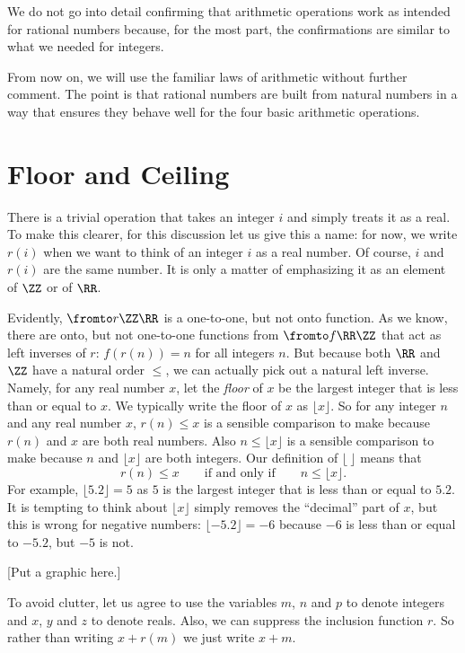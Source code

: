 \documentclass[10pt,oneside,tightlist]{memoir}
\begin{document}
We do not go into detail confirming that arithmetic operations work as intended for rational numbers because, for the most part,
the confirmations are similar to what we needed for integers.

From now on, we will use the familiar laws of arithmetic without further comment. The point is that rational numbers
are built from natural numbers in a way that ensures they behave well for the four basic arithmetic operations. 


\section{Floor and Ceiling}

There is a trivial operation that takes 
 an integer $i$ and simply treats it as a real. To make this 
clearer, for this discussion let us give this a name: for now, we write $r(i)$ when we want to think of 
an integer $i$ as a real number. Of course, $i$ and $r(i)$ are the same number.
It is only a matter of emphasizing it as an element of $\ZZ$
or of $\RR$.

Evidently, $\fromto r\ZZ\RR$ is a one-to-one, but not onto function. As we know, there are onto, but not one-to-one functions
from $\fromto f\RR\ZZ$ that act as left inverses of $r$: $f(r(n)) = n$ for all integers $n$. But because both $\RR$ and $\ZZ$
have a natural order $\leq$, we can actually pick out a natural left inverse. Namely, for any real number $x$,
let the \emph{floor} of $x$ be the largest integer that is less than or equal to $x$. We typically write the floor of $x$
as $\lfloor x\rfloor$. So for any integer $n$ and any real number $x$, $r(n) \leq x$ is a sensible comparison to make because
$r(n)$ and $x$ are both real numbers. Also $n\leq \lfloor x\rfloor$ is a sensible comparison to make because
$n$ and $\lfloor x\rfloor$ are both integers. Our definition of $\lfloor\ \rfloor$ means that
\[ r(n)\leq x \qquad \mbox{if and only if}\qquad n\leq \lfloor x\rfloor.\]
For example, $\lfloor 5.2\rfloor = 5$ as $5$ is the largest integer that is less than or equal to $5.2$. 
It is tempting to think about $\lfloor x\rfloor$ simply removes the ``decimal'' part of $x$, but this is wrong for 
negative numbers: $\lfloor -5.2\rfloor = -6$ because $-6$ is less than or equal to $-5.2$, but $-5$ is not.

[Put a graphic here.]

To avoid clutter, let us agree to use the variables $m$, $n$ and $p$ to denote integers and $x$, $y$ and $z$ to denote reals.
Also, we can suppress the inclusion function $r$. So rather than writing $x+r(m)$ we just write $x+m$. 
\end{document}
